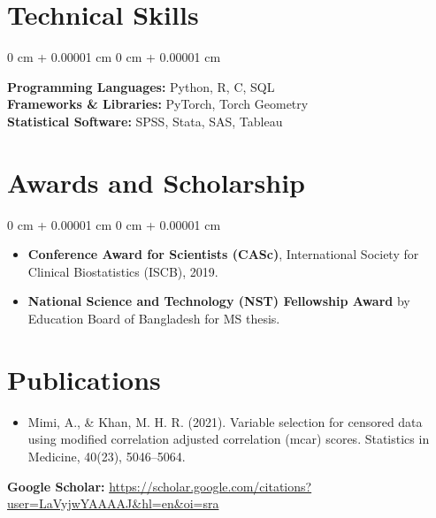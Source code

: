 \documentclass[10pt, letterpaper]{article}
\newenvironment{highlights}{
    \begin{itemize}[
        topsep=0.10 cm,
        parsep=0.10 cm,
        partopsep=0pt,
        itemsep=0pt,
        leftmargin=0 cm + 10pt
    ]
}{
    \end{itemize}
} %
\newenvironment{onecolentry}{
    \begin{adjustwidth}{
        0 cm + 0.00001 cm
    }{
        0 cm + 0.00001 cm
    }
}{
    \end{adjustwidth}
} %
\begin{document}
    \section{Technical Skills} 
        \begin{onecolentry}
            \textbf{Programming Languages:} Python, R, C, SQL\\
            \textbf{Frameworks \& Libraries:} PyTorch, Torch Geometry\\
            \textbf{Statistical Software:} SPSS, Stata, SAS, Tableau\\
        \end{onecolentry}
        
    \section{Awards and Scholarship}
        \begin{onecolentry}
            \begin{highlights}
                \item \textbf{Conference Award for Scientists (CASc)}, International Society for Clinical Biostatistics (ISCB), 2019.
                \item \textbf{National Science and Technology (NST) Fellowship Award} by Education Board of Bangladesh for MS thesis.
            \end{highlights}
        \end{onecolentry}


    \section{Publications}
        
        \begin{itemize}
            \item Mimi, A., \& Khan, M. H. R. (2021). Variable selection for censored data using modified correlation adjusted correlation (mcar) scores. Statistics in Medicine, 40(23), 5046–5064.     
           

        \end{itemize}
        \textbf{Google Scholar:} \href{https://scholar.google.com/citations?user=LaVyjwYAAAAJ&hl=en&oi=sra}{https://scholar.google.com/citations?user=LaVyjwYAAAAJ\&hl=en\&oi=sra}
\end{document}
